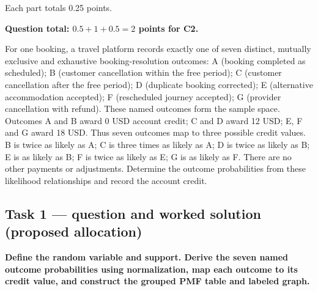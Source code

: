 Each part totals 0.25 points.

\par\vspace{3mm}\secInicio[][sec:q4]

\textbf{Question total: $0.5+1+0.5=2$ points for C2.}

\clearpage
{}

For one booking, a travel platform records exactly one of seven distinct, mutually exclusive and exhaustive booking-resolution outcomes: A (booking completed as scheduled); B (customer cancellation within the free period); C (customer cancellation after the free period); D (duplicate booking corrected); E (alternative accommodation accepted); F (rescheduled journey accepted); G (provider cancellation with refund). These named outcomes form the sample space. Outcomes A and B award 0 USD account credit; C and D award 12 USD; E, F and G award 18 USD. Thus seven outcomes map to three possible credit values. B is twice as likely as A; C is three times as likely as A; D is twice as likely as B; E is as likely as B; F is twice as likely as E; G is as likely as F. There are no other payments or adjustments. Determine the outcome probabilities from these likelihood relationships and record the account credit.

\subsection*{Task 1 --- question and worked solution (proposed allocation) }
\label{sol:q5t1}

\noindent\textbf{\boldmath Define the random variable and support. Derive the seven named outcome probabilities using normalization, map each outcome to its credit value, and construct the grouped PMF table and labeled graph.}\par\nopagebreak

